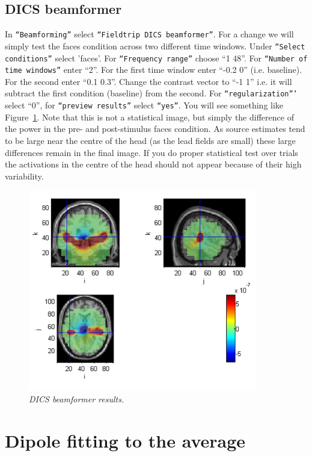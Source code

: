 \subsection{DICS beamformer}
In \texttt{``Beamforming''} select \texttt{``Fieldtrip DICS beamformer''}. For a change we will simply test the faces condition across two different time windows. Under \texttt{``Select conditions''} select 'faces'. For \texttt{``Frequency range''} choose ``1 48''. For \texttt{``Number of time windows''} enter ``2''. For the first time window enter ``-0.2 0'' (i.e. baseline). For the second enter ``0.1 0.3''. Change the contrast vector to ``-1 1'' i.e. it will subtract the first condition (baseline) from the second. For \texttt{``regularization'''} select ``0'', for \texttt{``preview results''} select \texttt{``yes''}. You will see something like Figure~\ref{meg_sloc:fig:13}. Note that this is not a statistical image, but simply the difference of the power in the pre- and post-stimulus faces condition.  As source estimates tend to be large near the centre of the head (as the lead fields are small) these large differences remain in the final image. If you do proper statistical test over trials the activations in the centre of the head should not appear because of their high variability.

\begin{figure}
\begin{center}
\includegraphics[width=100mm]{meg_sloc/slide13}
\caption{\em DICS beamformer results.\label{meg_sloc:fig:13}}
\end{center}
\end{figure}

\section{Dipole fitting to the average}

